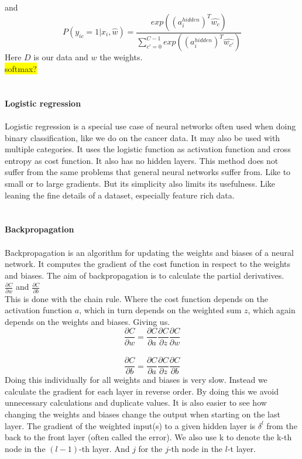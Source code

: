 \documentclass[12pt, letterpaper, twoside]{article}
\begin{document}
and
$$
P(y_{ic} = 1|x_i,\hat{w}) = \frac{exp((a_i^{hidden})^T \hat{w_c})}
{\sum_{c' = 0}^{C-1} exp((a_i^{hidden})^T \hat{w_{c'}})}
$$
Here $D$ is our data and $w$ the weights.\\
\colorbox{yellow}{softmax?}\\
\ \\
\ \\
\textbf{Logistic regression}\\
\ \\
Logistic regression is a special use case of neural networks often used when doing binary classification, like we do on the cancer data. It may also be used with multiple categories. It uses the logistic function as activation function and cross entropy as cost function. It also has no hidden layers.
This method does not suffer from the same problems that general neural networks suffer from. Like to small or to large gradients. But its simplicity also limits its usefulness. Like leaning the fine details of a dataset, especially feature rich data.\\
\ \\
\ \\
\textbf{Backpropagation}\\
\ \\
Backpropagation is an algorithm for updating the weights and biases of a neural network. It computes the gradient of the cost function in respect to the weights and biases. The aim of backpropagation is to calculate the partial derivatives. \\
$\frac{\partial C}{\partial w}$ and $\frac{\partial C}{\partial b}$\\
This is done with the chain rule. Where the cost function depends on the activation function $a$, which in turn depends on the weighted sum $z$, which again depends on the weights and biases. Giving us.\\
$$
\frac{\partial C}{\partial w} = \frac{\partial C}{\partial a}\frac{\partial C}{\partial z}\frac{\partial C}{\partial w}
$$
\ \\
$$
\frac{\partial C}{\partial b} = \frac{\partial C}{\partial a}\frac{\partial C}{\partial z}\frac{\partial C}{\partial b}
$$
Doing this individually for all weights and biases is very slow. Instead we calculate the gradient for each layer in reverse order. By doing this we avoid unnecessary calculations and duplicate values. It is also easier to see how changing the weights and biases change the output when starting on the last layer. The gradient of the weighted input(s) to a given hidden layer is $\delta^l$ from the back to the front layer (often called the error). We also use k to denote the k-th node in the $(l-1)$-th layer. And $j$ for the $j$-th node in the $l$-t layer.\\
\end{document}
